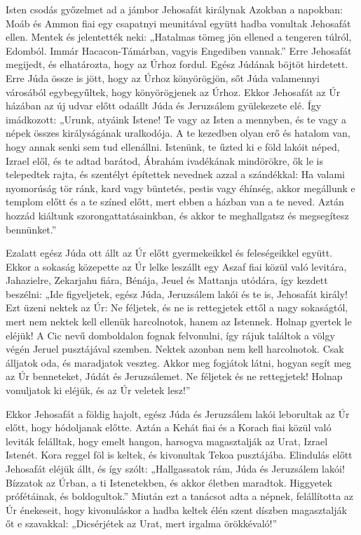 \documentclass[twoside]{article}
\begin{document}
\begin{lectio}{Isten csodás győzelmet ad a jámbor Jehosafát királynak}
\noindent Azokban a napokban: Moáb és Ammon fiai egy csapatnyi meunitával együtt hadba vonultak Jehosafát ellen. Mentek és jelentették neki: „Hatalmas tömeg jön ellened a tengeren túlról, Edomból. Immár Hacacon-Támárban, vagyis Engediben vannak.” Erre Jehosafát megijedt, és elhatározta, hogy az Úrhoz fordul. Egész Júdának böjtöt hirdetett. Erre Júda össze is jött, hogy az Úrhoz könyörögjön, sőt Júda valamennyi városából egybegyűltek, hogy könyörögjenek az Úrhoz. Ekkor Jehosafát az Úr házában az új udvar előtt odaállt Júda és Jeruzsálem gyülekezete elé. Így imádkozott: „Urunk, atyáink Istene! Te vagy az Isten a mennyben, és te vagy a népek összes királyságának uralkodója. A te kezedben olyan erő és hatalom van, hogy annak senki sem tud ellenállni. Istenünk, te űzted ki e föld lakóit néped, Izrael elől, és te adtad barátod, Ábrahám ivadékának mindörökre, ők le is telepedtek rajta, és szentélyt építettek nevednek azzal a szándékkal: Ha valami nyomorúság tör ránk, kard vagy büntetés, pestis vagy éhínség, akkor megállunk e templom előtt és a te színed előtt, mert ebben a házban van a te neved. Aztán hozzád kiáltunk szorongattatásainkban, és akkor te meghallgatsz és megsegítesz bennünket.”

Ezalatt egész Júda ott állt az Úr előtt gyermekeikkel és feleségeikkel együtt. Ekkor a sokaság közepette az Úr lelke leszállt egy Aszaf fiai közül való levitára, Jahazielre, Zekarjahu fiára, Bénája, Jeuel és Mattanja utódára, így kezdett beszélni: „Ide figyeljetek, egész Júda, Jeruzsálem lakói és te is, Jehosafát király! Ezt üzeni nektek az Úr: Ne féljetek, és ne is rettegjetek ettől a nagy sokaságtól, mert nem nektek kell ellenük harcolnotok, hanem az Istennek. Holnap gyertek le eléjük! A Cic nevű domboldalon fognak felvonulni, így rájuk találtok a völgy végén Jeruel pusztájával szemben. Nektek azonban nem kell harcolnotok. Csak álljatok oda, és maradjatok veszteg. Akkor meg fogjátok látni, hogyan segít meg az Úr benneteket, Júdát és Jeruzsálemet. Ne féljetek és ne rettegjetek! Holnap vonuljatok ki eléjük, és az Úr veletek lesz!”

Ekkor Jehosafát a földig hajolt, egész Júda és Jeruzsálem lakói leborultak az Úr előtt, hogy hódoljanak előtte. Aztán a Kehát fiai és a Korach fiai közül való leviták felálltak, hogy emelt hangon, harsogva magasztalják az Urat, Izrael Istenét. Kora reggel föl is keltek, és kivonultak Tekoa pusztájába. Elindulás előtt Jehosafát eléjük állt, és így szólt: „Hallgassatok rám, Júda és Jeruzsálem lakói! Bízzatok az Úrban, a ti Istenetekben, és akkor életben maradtok. Higgyetek prófétáinak, és boldogultok.” Miután ezt a tanácsot adta a népnek, felállította az Úr énekeseit, hogy kivonuláskor a hadba keltek élén szent díszben magasztalják őt e szavakkal: „Dicsérjétek az Urat, mert irgalma örökkévaló!”


\end{lectio}
\end{document}
